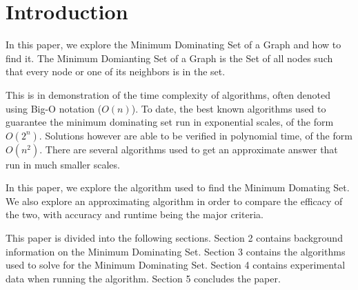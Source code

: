 \documentclass[paper.tex]{subfiles}
\begin{document}
\section{Introduction}

In this paper, we explore the Minimum Dominating Set of a Graph and how to find it.
The Minimum Domianting Set of a Graph is the Set of all nodes such that every node or one of its neighbors is in the set.

This is in demonstration of the time complexity of algorithms, often denoted using Big-O notation ($O(n)$).
To date, the best known algorithms used to guarantee the minimum dominating set run in exponential scales, of the form $O(2^n)$.
Solutions however are able to be verified in polynomial time, of the form $O(n^2)$.
There are several algorithms used to get an approximate answer that run in much smaller scales.

In this paper, we explore the algorithm used to find the Minimum Domating Set.
We also explore an approximating algorithm in order to compare the efficacy of the two, with accuracy and runtime being the major criteria.

This paper is divided into the following sections. 
Section 2 contains background information on the Minimum Dominating Set.
Section 3 contains the algorithms used to solve for the Minimum Dominating Set.
Section 4 contains experimental data when running the algorithm.
Section 5 concludes the paper.
\end{document}
